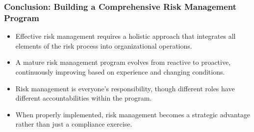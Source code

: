 \documentclass{beamer}
\begin{document}
            \begin{frame}
              \frametitle{Conclusion: Building a Comprehensive Risk Management Program}
              \scriptsize
              \begin{itemize}
                \item Effective risk management requires a holistic approach that integrates all elements of the risk process into organizational operations.
                \item A mature risk management program evolves from reactive to proactive, continuously improving based on experience and changing conditions.
                \item Risk management is everyone's responsibility, though different roles have different accountabilities within the program.
                \item When properly implemented, risk management becomes a strategic advantage rather than just a compliance exercise.
              \end{itemize}
              
              \begin{center}
              \end{center}
              \end{frame}
        
\end{document}

